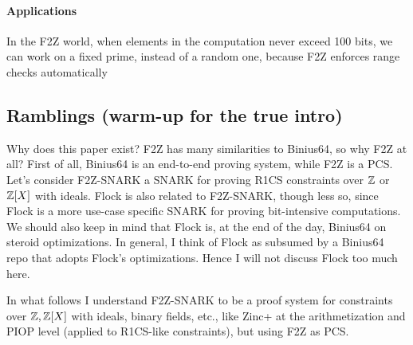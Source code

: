 \documentclass[11pt,letterpaper,usenames,dvipsnames]{article}
\begin{document}
\paragraph{Applications}


In the F2Z world, when elements in the computation never exceed 100 bits, we can work on a fixed prime, instead of a random one, because F2Z enforces range checks automatically





\subsection{Ramblings (warm-up for the true intro)}
Why does this paper exist? F2Z has many similarities to Binius64, so why F2Z at all? First of all, Binius64 is an end-to-end proving system, while F2Z is a PCS. Let's consider F2Z-SNARK a SNARK for proving R1CS constraints over $\mathbb{Z}$  or $\mathbb{Z}[X]$ with ideals. Flock is also related to F2Z-SNARK, though less so, since Flock is a more use-case specific SNARK for proving bit-intensive computations. We should also keep in mind that Flock is, at the end of the day, Binius64 on steroid optimizations. In general, I think of Flock as subsumed by a Binius64 repo that adopts Flock's optimizations. Hence I will not discuss Flock too much here.

In what follows I understand F2Z-SNARK to be a proof system for constraints over $\mathbb{Z}, \mathbb{Z}[X]$ with ideals, binary fields, etc., like Zinc+ at the arithmetization and PIOP level (applied to R1CS-like constraints), but using F2Z as PCS.
\end{document}
